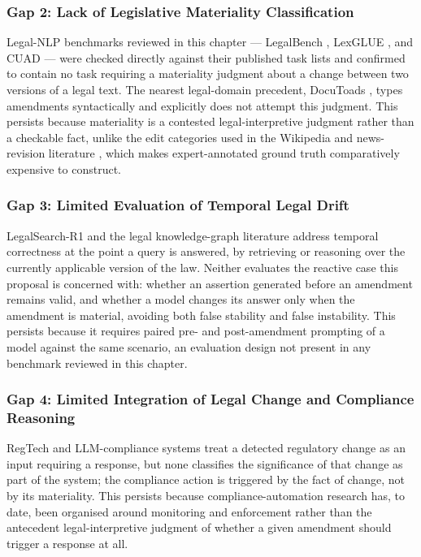 \subsubsection{Gap 2: Lack of Legislative Materiality Classification}

Legal-NLP benchmarks reviewed in this chapter — LegalBench \cite{guha2023legalbench}, LexGLUE \cite{chalkidis2022lexglue}, and CUAD \cite{hendrycks2021cuad} — were checked directly against their published task lists and confirmed to contain no task requiring a materiality judgment about a change between two versions of a legal text. The nearest legal-domain precedent, DocuToads \cite{hermansson2016docutoads}, types amendments syntactically and explicitly does not attempt this judgment. This persists because materiality is a contested legal-interpretive judgment rather than a checkable fact, unlike the edit categories used in the Wikipedia and news-revision literature \cite{daxenberger2013wikipedia,spangher2022newsedits}, which makes expert-annotated ground truth comparatively expensive to construct.

\subsubsection{Gap 3: Limited Evaluation of Temporal Legal Drift}

LegalSearch-R1 \cite{fan2026legalsearchr1} and the legal knowledge-graph literature \cite{demartim2025satgraph,demartim2025lrmoo} address temporal correctness at the point a query is answered, by retrieving or reasoning over the currently applicable version of the law. Neither evaluates the reactive case this proposal is concerned with: whether an assertion generated before an amendment remains valid, and whether a model changes its answer only when the amendment is material, avoiding both false stability and false instability. This persists because it requires paired pre- and post-amendment prompting of a model against the same scenario, an evaluation design not present in any benchmark reviewed in this chapter.

\subsubsection{Gap 4: Limited Integration of Legal Change and Compliance Reasoning}

RegTech and LLM-compliance systems \cite{bonatti2020pronto,li2025regtech,hassani2024llmcompliance} treat a detected regulatory change as an input requiring a response, but none classifies the significance of that change as part of the system; the compliance action is triggered by the fact of change, not by its materiality. This persists because compliance-automation research has, to date, been organised around monitoring and enforcement rather than the antecedent legal-interpretive judgment of whether a given amendment should trigger a response at all.

